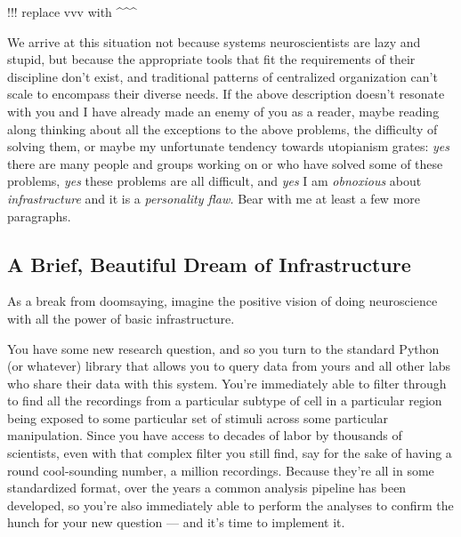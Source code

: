 \documentclass{article}
\begin{document}
!!! replace vvv with \^{}\^{}\^{}

We arrive at this situation not because systems neuroscientists are lazy
and stupid, but because the appropriate tools that fit the requirements
of their discipline don't exist, and traditional patterns of centralized
organization can't scale to encompass their diverse needs. If the above
description doesn't resonate with you and I have already made an enemy
of you as a reader, maybe reading along thinking about all the
exceptions to the above problems, the difficulty of solving them, or
maybe my unfortunate tendency towards utopianism grates: \emph{yes}
there are many people and groups working on or who have solved some of
these problems, \emph{yes} these problems are all difficult, and
\emph{yes} I am \emph{obnoxious} about \emph{infrastructure} and it is a
\emph{personality flaw.} Bear with me at least a few more paragraphs.

\hypertarget{a-brief-beautiful-dream-of-infrastructure}{%
\subsection{A Brief, Beautiful Dream of
Infrastructure}\label{a-brief-beautiful-dream-of-infrastructure}}

As a break from doomsaying, imagine the positive vision of doing
neuroscience with all the power of basic infrastructure.

You have some new research question, and so you turn to the standard
Python (or whatever) library that allows you to query data from yours
and all other labs who share their data with this system. You're
immediately able to filter through to find all the recordings from a
particular subtype of cell in a particular region being exposed to some
particular set of stimuli across some particular manipulation. Since you
have access to decades of labor by thousands of scientists, even with
that complex filter you still find, say for the sake of having a round
cool-sounding number, a million recordings. Because they're all in some
standardized format, over the years a common analysis pipeline has been
developed, so you're also immediately able to perform the analyses to
confirm the hunch for your new question --- and it's time to implement
it.
\end{document}
